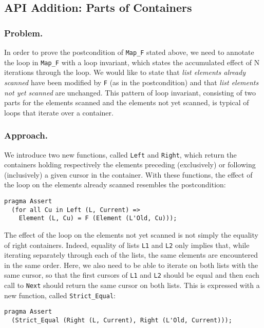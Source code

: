 \documentclass[runningheads,a4paper]{llncs}
\newcommand{\beforesub}{\vspace{-0.2cm}}
\newcommand{\aftersub}{\vspace{-0.1cm}}
\begin{document}
\beforesub
\subsection{API Addition: Parts of Containers}
\label{sec:container-parts}
\aftersub

\subsubsection{Problem.}

In order to prove the postcondition of \verb|Map_F| stated above, we need to
annotate the loop in \verb|Map_F| with a loop invariant, which states the
accumulated effect of N iterations through the loop. We would like to state
that \emph{list elements already scanned} have been modified by \verb|F| (as in
the postcondition) and that \emph{list elements not yet scanned} are
unchanged. This pattern of loop invariant, consisting of two parts for the
elements scanned and the elements not yet scanned, is typical of loops that
iterate over a container.

\subsubsection{Approach.}

We introduce two new functions, called \verb|Left| and \verb|Right|, which
return the containers holding respectively the elements preceding (exclusively) or
following (inclusively) a given cursor in the container. With these functions, the effect of
the loop on the elements already scanned resembles the postcondition:
\begin{verbatim}
pragma Assert 
  (for all Cu in Left (L, Current) => 
    Element (L, Cu) = F (Element (L'Old, Cu)));
\end{verbatim}
The effect of the loop on the elements not yet scanned is not simply the
equality of right containers. Indeed, equality of lists \verb|L1| and \verb|L2|
only implies that, while iterating separately through each of the lists, the
same elements are encountered in the same order. Here, we also need to be able
to iterate on both lists with the same cursor, so that the first cursors of
\verb|L1| and \verb|L2| should be equal and then each call to \verb|Next|
should return the same cursor on both lists.
This is expressed with a new
function, called \verb|Strict_Equal|:
\begin{verbatim}
pragma Assert 
  (Strict_Equal (Right (L, Current), Right (L'Old, Current)));
\end{verbatim}
\end{document}
